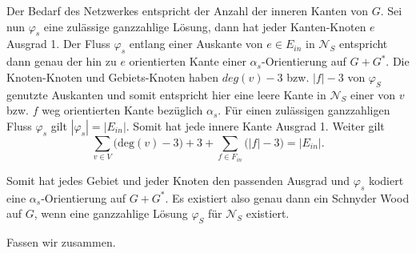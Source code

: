 Der Bedarf des Netzwerkes entspricht der Anzahl der inneren Kanten von $G$. Sei nun $\varphi_s$ eine zulässige ganzzahlige Lösung, dann hat jeder Kanten-Knoten $e$ Ausgrad 1. Der Fluss $\varphi_s$ entlang einer Auskante von $e \in E_{in}$ in $\mathcal{N}_S$ entspricht dann genau der hin zu $e$ orientierten Kante einer $\alpha_{s}$-Orientierung auf $G+G^*$. Die Knoten-Knoten und Gebiets-Knoten haben $deg(v)-3$ bzw. $|f|-3$ von $\varphi_S$ genutzte Auskanten und somit entspricht hier eine leere Kante in $\mathcal{N}_S$ einer von $v$ bzw. $f$ weg orientierten Kante bezüglich $\alpha_{s}$. Für einen zulässigen ganzzahligen Fluss $\varphi_s$ gilt $|\varphi_s| = |E_{in}|$. Somit hat jede innere Kante Ausgrad 1. Weiter gilt 
$$\sum_{v \in V} \Big(\text{deg}(v)-3\Big) + 3 + \sum_{f \in F_{in}} \Big(|f|-3\Big) = |E_{in}|.$$

Somit hat jedes Gebiet und jeder Knoten den passenden Ausgrad und $\varphi_s$ kodiert eine $\alpha_s$-Orientierung auf $G+G^*$. Es existiert also genau dann ein Schnyder Wood auf $G$, wenn eine ganzzahlige Lösung $\varphi_S$ für $\mathcal{N}_S$ existiert.

Fassen wir zusammen.

